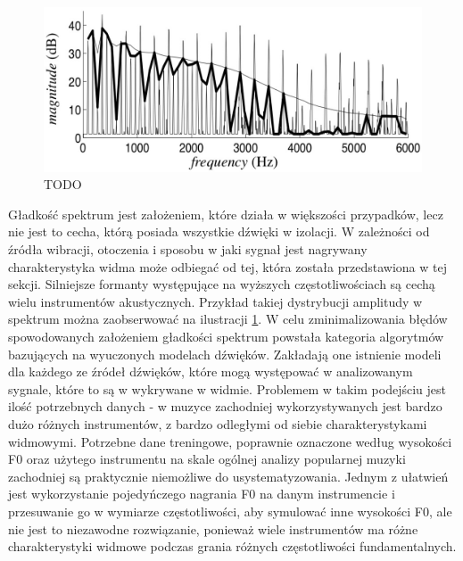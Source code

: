 \documentclass[12pt,a4paper,twoside]{mwart}
\begin{document}
\begin{figure}[ht]
  \begin{center}
    \includegraphics[scale=0.38]{images/spectral_smoothnes_kapuri.jpg}
    \caption{TODO}
    \label{fig:specUnSmoothness}
  \end{center}
\end{figure}

Gładkość spektrum jest założeniem, które działa w większości przypadków, lecz nie jest to cecha, którą posiada wszystkie dźwięki w izolacji. W zależności od źródła wibracji, otoczenia i sposobu w jaki sygnał jest nagrywany charakterystyka widma może odbiegać od tej, która została przedstawiona w tej sekcji. Silniejsze formanty występujące na wyższych częstotliwościach są cechą wielu instrumentów akustycznych. Przykład takiej dystrybucji amplitudy w spektrum można zaobserwować na ilustracji \ref{fig:specUnSmoothness}. W celu zminimalizowania błędów spowodowanych założeniem gładkości spektrum powstała kategoria algorytmów bazujących na wyuczonych modelach dźwięków. Zakładają one istnienie modeli dla każdego ze źródeł dźwięków, które mogą występować w analizowanym sygnale, które to są w wykrywane w widmie. Problemem w takim podejściu jest ilość potrzebnych danych - w muzyce zachodniej wykorzystywanych jest bardzo dużo różnych instrumentów, z bardzo odległymi od siebie charakterystykami widmowymi. Potrzebne dane treningowe, poprawnie oznaczone według wysokości F0 oraz użytego instrumentu na skale ogólnej analizy popularnej muzyki zachodniej są praktycznie niemożliwe do usystematyzowania. Jednym z ułatwień jest wykorzystanie pojedyńczego nagrania F0 na danym instrumencie i przesuwanie go w wymiarze częstotliwości, aby symulować inne wysokości F0, ale nie jest to niezawodne rozwiązanie, ponieważ wiele instrumentów ma różne charakterystyki widmowe podczas grania różnych częstotliwości fundamentalnych\cite[55-68]{Transcription:Quenneville:Thesis}.
\end{document}
